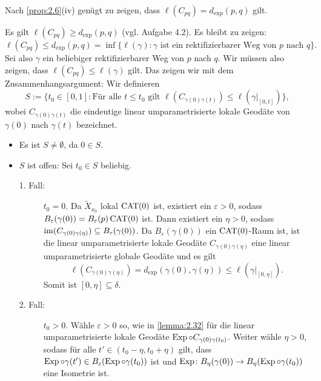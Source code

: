 \begin{beweis}
	Nach \autoref{prop:2.6}(iv) genügt zu zeigen, dass $\ell(C_{pq}) = d_{\exp}(p,q)$ gilt.
	
	Es gilt $\ell(C_{pq}) \geq d_{\exp}(p,q)$ (vgl. Aufgabe 4.2). Es bleibt zu zeigen:
	\[
		\ell(C_{pq}) \leq d_{\exp}(p,q) = \inf\{ \ell(\gamma) : \gamma \text{ ist ein rektifizierbarer Weg von } p \text{ nach } q\}.
	\]
	Sei also $\gamma$ ein beliebiger rektifizierbarer Weg von $p$ nach $q$.
	Wir müssen also zeigen, dass $\ell(C_{pq}) \leq \ell(\gamma)$ gilt.
	Das zeigen wir mit dem Zusammenhangsargument:
	Wir definieren
	\[
		S := \{ t_0 \in [0,1] : \text{Für alle } t \leq t_0 \text{ gilt } \ell(C_{\gamma(0)\gamma(t)}) \leq \ell(\gamma \big|_{[0,t]})\},
	\]
	wobei $C_{\gamma(0)\gamma(t)}$ die eindeutige linear umparametrisierte lokale Geodäte von $\gamma(0)$ nach $\gamma(t)$ bezeichnet.
	\begin{itemize}
		\item Es ist $S \neq \emptyset$, da $0 \in S$.
		\item $S$ ist offen:
		Sei $t_0 \in S$ beliebig.
		\begin{description}
			\item [1. Fall:] $t_0 = 0$.
			Da $\tilde{X}_{x_0}$ lokal $\operatorname{CAT(0)}$ ist, existiert ein $\varepsilon > 0$, sodass $B_\varepsilon(\gamma(0)) = B_\varepsilon(p) \operatorname{CAT(0)}$ ist.
			Dann existiert ein $\eta > 0$, sodass $\operatorname{im}(C_{\gamma(0)\gamma(\eta)}) \subseteq B_\varepsilon(\gamma(0))$.
			Da $B_\varepsilon(\gamma(0))$ ein $\operatorname{CAT(0)}$-Raum ist, ist die linear umparametrisierte lokale Geodäte $C_{\gamma(0)\gamma(\eta)}$ eine linear umparametrisierte globale Geodäte und es gilt
			\[
				\ell(C_{\gamma(0)\gamma(\eta)}) = d_{\exp}(\gamma(0),\gamma(\eta)) \leq \ell(\gamma \big|_{[0,\eta]}).
			\]
			Somit ist $[0,\eta] \subseteq \delta$.
			\item[2. Fall:] $t_0 > 0$.
			Wähle $\varepsilon > 0$ so, wie in \autoref{lemma:2.32} für die linear umparametrisierte lokale Geodäte $\operatorname{Exp} \circ C_{\gamma(0)\gamma(t_0)}$.
			Weiter wähle $\eta > 0$, sodass für alle $t' \in (t_0-\eta, t_0 + \eta)$ gilt, dass $\operatorname{Exp} \circ \gamma(t') \in B_\varepsilon(\operatorname{Exp} \circ \gamma(t_0))$ ist und $\operatorname{Exp} \colon B_\eta(\gamma(0)) \rightarrow B_\eta(\operatorname{Exp}\circ \gamma(t_0))$ eine Isometrie ist.
			

\end{description}
\end{itemize}
\end{beweis}

